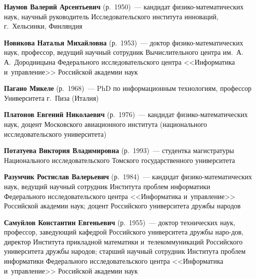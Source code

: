 \begin{multicols}{2}
\noindent
\textbf{Наумов Валерий Арсентьевич} (р.\ 1950)~--- 
кандидат фи\-зи\-ко-ма\-те\-ма\-ти\-че\-ских наук, 
научный руководитель Исследовательского института инноваций, 
г.~Хельсинки, Финляндия

\vspace*{3pt}

\noindent
\textbf{Новикова Наталья Михайловна} (р.\ 1953)~--- 
доктор фи\-зи\-ко-ма\-те\-ма\-ти\-че\-ских наук, профессор, ведущий научный сотрудник 
Вычислительного центра им.\ А.\,А.~Дородницына Федерального исследовательского центра 
<<Информатика и~управ\-ле\-ние>> Российской академии наук

\vspace*{3pt}

\noindent
\textbf{Пагано Микеле} (р.\ 1968)~---
PhD по информационным технологиям, профессор Университета 
г.\ Пиза (Италия) 

\vspace*{3pt}

\noindent
\textbf{Платонов Евгений Николаевич} (р.\ 1976)~---  
кандидат фи\-зи\-ко-ма\-те\-ма\-ти\-че\-ских наук, 
доцент Московского авиационного института (национального исследовательского 
университета)

\vspace*{3pt}

\noindent
\textbf{Потатуева Виктория Владимировна} (р.\ 1993)~---  
студентка магистратуры Национального исследовательского 
Томского государственного университета

\vspace*{3pt}


\noindent
\textbf{Разумчик Ростислав Валерьевич} (р.\ 1984)~--- 
кандидат фи\-зи\-ко-ма\-те\-ма\-ти\-че\-ских наук, 
ведущий научный сотрудник Института проб\-лем 
информатики Федерального исследовательского центра <<Информатика и~управ\-ле\-ние>>
Российской академии наук;  доцент Российского университета дружбы народов

\vspace*{3pt}

\noindent
\textbf{Самуйлов Константин Евгеньевич} (р.\ 1955)~---
доктор технических наук, профессор, заведующий ка\-фед\-рой Российского 
университета дружбы наро-\linebreak дов, директор Института прикладной математики\linebreak 
и~телекоммуникаций Российского университета дружбы народов; 
старший научный сотрудник Института проб\-лем информатики Федерального 
исследовательского центра <<Информатика и~управ\-ле\-ние>> 
Российской академии наук


\end{multicols}
